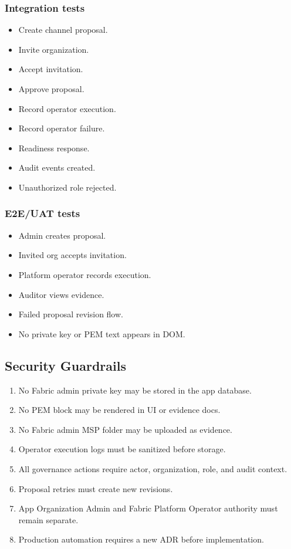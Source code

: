 \subsubsection{Integration tests}

\begin{itemize}
  \item Create channel proposal.
  \item Invite organization.
  \item Accept invitation.
  \item Approve proposal.
  \item Record operator execution.
  \item Record operator failure.
  \item Readiness response.
  \item Audit events created.
  \item Unauthorized role rejected.
\end{itemize}

\subsubsection{E2E/UAT tests}

\begin{itemize}
  \item Admin creates proposal.
  \item Invited org accepts invitation.
  \item Platform operator records execution.
  \item Auditor views evidence.
  \item Failed proposal revision flow.
  \item No private key or PEM text appears in DOM.
\end{itemize}

\subsection{Security Guardrails}

\begin{enumerate}
  \item No Fabric admin private key may be stored in the app database.
  \item No PEM block may be rendered in UI or evidence docs.
  \item No Fabric admin MSP folder may be uploaded as evidence.
  \item Operator execution logs must be sanitized before storage.
  \item All governance actions require actor, organization, role, and audit context.
  \item Proposal retries must create new revisions.
  \item App Organization Admin and Fabric Platform Operator authority must remain separate.
  \item Production automation requires a new ADR before implementation.
\end{enumerate}

